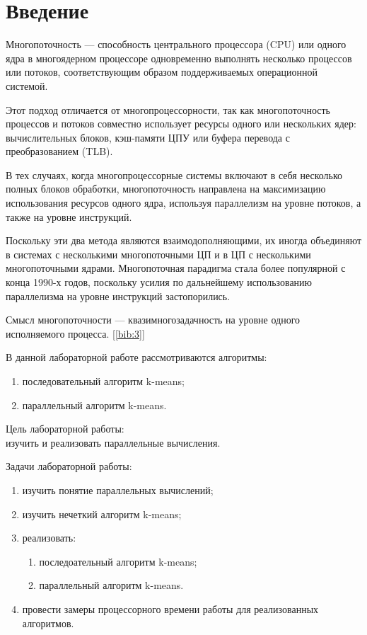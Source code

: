 \section*{\large Введение}

\par Многопоточность — способность центрального процессора (CPU) или одного ядра в многоядерном процессоре одновременно выполнять несколько процессов или потоков, соответствующим образом поддерживаемых операционной системой.
\par Этот подход отличается от многопроцессорности, так как многопоточность процессов и потоков совместно использует ресурсы одного или нескольких ядер: вычислительных блоков, кэш-памяти ЦПУ или буфера перевода с преобразованием (TLB).
\par В тех случаях, когда многопроцессорные системы включают в себя несколько полных блоков обработки, многопоточность направлена на максимизацию использования ресурсов одного ядра, используя параллелизм на уровне потоков, а также на уровне инструкций.
\par Поскольку эти два метода являются взаимодополняющими, их иногда объединяют в системах с несколькими многопоточными ЦП и в ЦП с несколькими многопоточными ядрами. Многопоточная парадигма стала более популярной с конца 1990-х годов, поскольку
усилия по дальнейшему использованию параллелизма на уровне инструкций застопорились.
\par Смысл многопоточности — квазимногозадачность на уровне одного исполняемого процесса. [\ref{bib:3}]
	
	В данной лабораторной работе рассмотриваются алгоритмы:

	\begin{enumerate}
		\item последовательный алгоритм k-means;
		\item параллельный алгоритм k-means.
	\end{enumerate}

	Цель лабораторной работы:\\
	изучить и реализовать параллельные вычисления.

	Задачи лабораторной работы:
	\begin{enumerate}
		\item изучить понятие параллельных вычислений;
		\item изучить нечеткий алгоритм k-means;
		\item реализовать:
		\begin{enumerate}
			\item последоательный алгоритм k-means;
			\item параллельный алгоритм k-means.
		\end{enumerate}
		\item провести замеры процессорного времени работы для реализованных алгоритмов.
	\end{enumerate}
\newpage